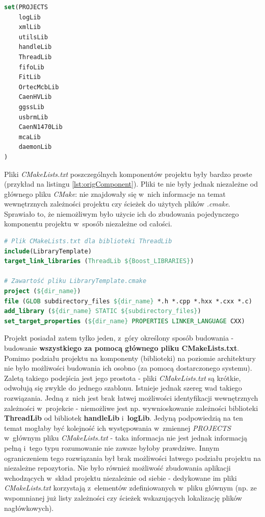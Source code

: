\begin{lstlisting}[language=cmake, caption={Fragment oryginalnego pliku \textit{CMakeLists.txt} znajdującego się w~katalogu głównym pierwotnej wersji projektu przedstawiający zmienną \textit{PROJECTS} zawierającą listę bibliotek \cite{PluteckiMgr}}, label={lst:orig}]
set(PROJECTS
    logLib
    xmlLib
    utilsLib
    handleLib
    ThreadLib
    fifoLib
    FitLib
    OrtecMcbLib
    CaenHVLib
    ggssLib
    usbrmLib
    CaenN1470Lib
    mcaLib
    daemonLib
)
\end{lstlisting}

Pliki \textit{CMakeLists.txt} poszczególnych komponentów projektu były bardzo proste (przykład na listingu \ref{lst:origComponent}). Pliki te nie były jednak niezależne od głównego pliku \textit{CMake}: nie znajdowały się w~nich informacje na temat wewnętrznych zależności projektu czy ścieżek do użytych plików \textit{.cmake}. Sprawiało to, że niemożliwym było użycie ich do zbudowania pojedynczego komponentu projektu w~sposób niezależne od całości. 

\begin{lstlisting}[language=cmake, caption={Oryginalny pliku \textit{CMakeLists.txt} służący do budowania biblioteki \textit{ThreadLib} oraz zawartość pliku \textit{LibraryTemplate.cmake} \cite{PluteckiMgr}}, label={lst:origComponent}]
# Plik CMakeLists.txt dla biblioteki ThreadLib
include(LibraryTemplate)
target_link_libraries (ThreadLib ${Boost_LIBRARIES})

# Zawartość pliku LibraryTemplate.cmake
project (${dir_name})
file (GLOB subdirectory_files ${dir_name} *.h *.cpp *.hxx *.cxx *.c)
add_library (${dir_name} STATIC ${subdirectory_files})
set_target_properties (${dir_name} PROPERTIES LINKER_LANGUAGE CXX)
\end{lstlisting}

Projekt posiadał zatem tylko jeden, z~góry określony sposób budowania - budowanie \textbf{wszystkiego za pomocą głównego pliku CMakeLists.txt}. Pomimo podziału projektu na komponenty (biblioteki) na poziomie architektury nie było możliwości budowania ich osobno (za pomocą dostarczonego systemu). Zaletą takiego podejścia jest jego prostota - pliki \textit{CMakeLists.txt} są krótkie, odwołują się zwykle do jednego szablonu. Istnieje jednak szereg wad takiego rozwiązania. Jedną z~nich jest brak łatwej możliwości identyfikacji wewnętrznych zależności w~projekcie - niemożliwe jest np. wywnioskowanie zależności biblioteki \textbf{ThreadLib} od bibliotek \textbf{handleLib} i~\textbf{logLib}. Jedyną podpowiedzią na ten temat mogłaby być kolejność ich występowania w~zmiennej \textit{PROJECTS} w~głównym pliku \textit{CMakeLists.txt} - taka informacja nie jest jednak informacją pełną i~tego typu rozumowanie nie zawsze byłoby prawdziwe. Innym ograniczeniem tego rozwiązania był brak możliwości łatwego podziału projektu na niezależne repozytoria. Nie było również możliwość zbudowania aplikacji wchodzących w~skład projektu niezależnie od siebie - dedykowane im pliki \textit{CMakeLists.txt} korzystają z~elementów zdefiniowanych w~pliku głównym (np. ze wspomnianej już listy zależności czy ścieżek wskazujących lokalizację plików nagłówkowych). 


